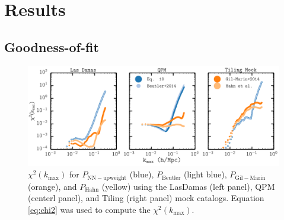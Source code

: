 \documentclass{emulateapj}
\begin{document}
\section{Results} \label{sec:results}
\subsection{Goodness-of-fit} \label{sec:litcomp}
\begin{figure} 
\begin{center}
\includegraphics[scale=0.55]{fcpaper_pk_chisquared_comparison.png} 
\caption{$\chi^2 (k_\mathrm{max})$ for $P_\mathrm{NN-upweight}$ (blue), $P_\mathrm{Beutler}$ (light blue), $P_\mathrm{Gil-Marin}$ (orange), and $P_\mathrm{Hahn}$ (yellow) using the LasDamas (left panel), QPM (centerl panel), and Tiling (right panel) mock catalogs. Equation \ref{eq:chi2} was used to compute the $\chi^2(k_\mathrm{max})$. }\label{fig:peaksnchi2}
\end{center}
\end{figure}
\end{document}
